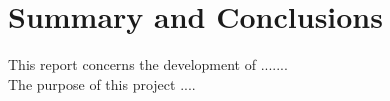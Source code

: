 \section*{Summary and Conclusions}

This report concerns the development of .......\\
The purpose of this project ....


